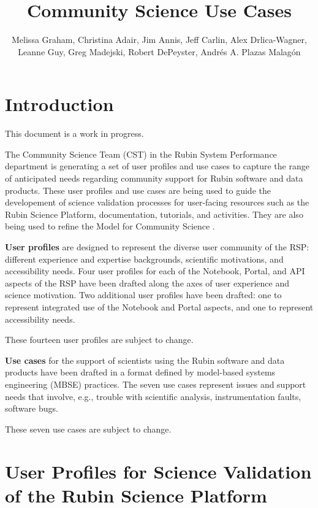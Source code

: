 \documentclass[DM,lsstdraft,authoryear,toc]{lsstdoc}
\title{Community Science Use Cases}
\author{%
Melissa Graham, Christina Adair, Jim Annis, Jeff Carlin, Alex Drlica-Wagner, Leanne Guy, Greg Madejski, Robert DePeyster, Andrés A. Plazas Malagón
}
\date{\vcsDate}
\begin{document}
\maketitle


\section{Introduction}

This document is a work in progress.

The Community Science Team (CST) in the Rubin System Performance department is generating a set of user profiles and use cases
to capture the range of anticipated needs regarding community support for Rubin software and data products.
These user profiles and use cases are being used to guide the developement of science validation processes for
user-facing resources such as the Rubin Science Platform, documentation, tutorials, and activities.
They are also being used to refine the Model for Community Science .

\textbf{User profiles} are designed to represent the diverse user community of the RSP:
different experience and expertise backgrounds, scientific motivations, and accessibility needs.
Four user profiles for each of the Notebook, Portal, and API aspects of the RSP have been drafted along
the axes of user experience and science motivation.
Two additional user profiles have been drafted: one to represent integrated use of the Notebook and Portal aspects,
and one to represent accessibility needs.

These fourteen user profiles are subject to change.

\textbf{Use cases} for the support of scientists using the Rubin software and data products have been drafted
in a format defined by model-based systems engineering (MBSE) practices.
The seven use cases represent issues and support needs that involve, e.g., trouble with scientific analysis,
instrumentation faults, software bugs.

These seven use cases are subject to change.

\clearpage
\section{User Profiles for Science Validation of the Rubin Science Platform}
\end{document}
